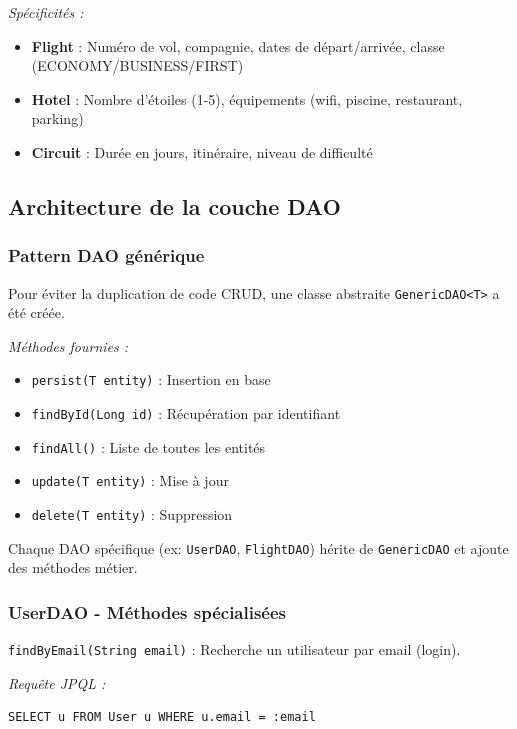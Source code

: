 \documentclass[12pt,a4paper]{report}
\begin{document}
\textit{Spécificités :}
\begin{itemize}
    \item \textbf{Flight} : Numéro de vol, compagnie, dates de départ/arrivée, classe (ECONOMY/BUSINESS/FIRST)
    \item \textbf{Hotel} : Nombre d'étoiles (1-5), équipements (wifi, piscine, restaurant, parking)
    \item \textbf{Circuit} : Durée en jours, itinéraire, niveau de difficulté
\end{itemize}

\subsection{Architecture de la couche DAO}

\subsubsection{Pattern DAO générique}

Pour éviter la duplication de code CRUD, une classe abstraite \texttt{GenericDAO<T>} a été créée.

\textit{Méthodes fournies :}
\begin{itemize}
    \item \texttt{persist(T entity)} : Insertion en base
    \item \texttt{findById(Long id)} : Récupération par identifiant
    \item \texttt{findAll()} : Liste de toutes les entités
    \item \texttt{update(T entity)} : Mise à jour
    \item \texttt{delete(T entity)} : Suppression
\end{itemize}

Chaque DAO spécifique (ex: \texttt{UserDAO}, \texttt{FlightDAO}) hérite de \texttt{GenericDAO} et ajoute des méthodes métier.

\subsubsection{UserDAO - Méthodes spécialisées}

\texttt{findByEmail(String email)} : Recherche un utilisateur par email (login).

\textit{Requête JPQL :}
\begin{verbatim}
SELECT u FROM User u WHERE u.email = :email
\end{verbatim}
\end{document}
